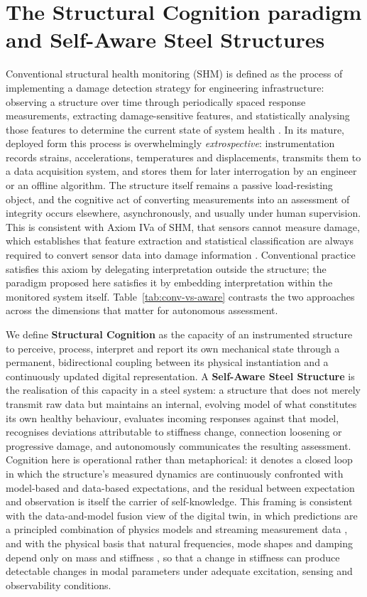 \section{The Structural Cognition paradigm and Self-Aware Steel Structures}\label{sec:paradigm}

Conventional structural health monitoring (SHM) is defined as the process of implementing a damage detection strategy for engineering infrastructure: observing a structure over time through periodically spaced response measurements, extracting damage-sensitive features, and statistically analysing those features to determine the current state of system health \citep{farrar2013shm}. In its mature, deployed form this process is overwhelmingly \textit{extrospective}: instrumentation records strains, accelerations, temperatures and displacements, transmits them to a data acquisition system, and stores them for later interrogation by an engineer or an offline algorithm. The structure itself remains a passive load-resisting object, and the cognitive act of converting measurements into an assessment of integrity occurs elsewhere, asynchronously, and usually under human supervision. This is consistent with Axiom IVa of SHM, that sensors cannot measure damage, which establishes that feature extraction and statistical classification are always required to convert sensor data into damage information \citep{farrar2013shm,farrar2007introduction}. Conventional practice satisfies this axiom by delegating interpretation outside the structure; the paradigm proposed here satisfies it by embedding interpretation within the monitored system itself. Table~\ref{tab:conv-vs-aware} contrasts the two approaches across the dimensions that matter for autonomous assessment.

We define \textbf{Structural Cognition} as the capacity of an instrumented structure to perceive, process, interpret and report its own mechanical state through a permanent, bidirectional coupling between its physical instantiation and a continuously updated digital representation. A \textbf{Self-Aware Steel Structure} is the realisation of this capacity in a steel system: a structure that does not merely transmit raw data but maintains an internal, evolving model of what constitutes its own healthy behaviour, evaluates incoming responses against that model, recognises deviations attributable to stiffness change, connection loosening or progressive damage, and autonomously communicates the resulting assessment. Cognition here is operational rather than metaphorical: it denotes a closed loop in which the structure's measured dynamics are continuously confronted with model-based and data-based expectations, and the residual between expectation and observation is itself the carrier of self-knowledge. This framing is consistent with the data-and-model fusion view of the digital twin, in which predictions are a principled combination of physics models and streaming measurement data \citep{brunton2019data,chiachio2022structural}, and with the physical basis that natural frequencies, mode shapes and damping depend only on mass and stiffness \citep{chopra2017dynamics,cook2002fea}, so that a change in stiffness can produce detectable changes in modal parameters under adequate excitation, sensing and observability conditions.

